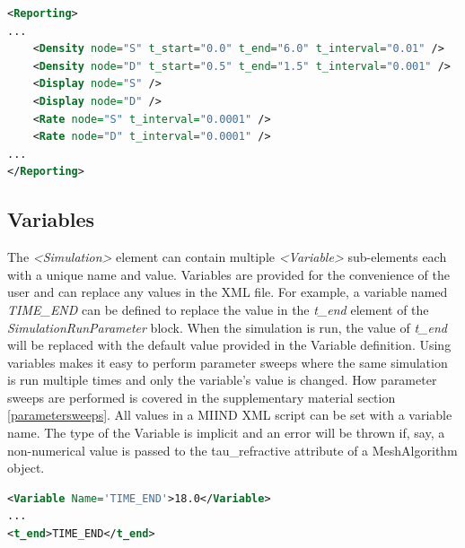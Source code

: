 \documentclass[utf8]{frontiersSCNS} %
\begin{document}
\begin{lstlisting}[language=xml,caption={A set of reporting definitions to record the probability densities and rates of two populations, S and D. The densities will also be displayed during simulation.}]
<Reporting>
...
	<Density node="S" t_start="0.0" t_end="6.0" t_interval="0.01" />
	<Density node="D" t_start="0.5" t_end="1.5" t_interval="0.001" />
	<Display node="S" />
	<Display node="D" />
	<Rate node="S" t_interval="0.0001" />
	<Rate node="D" t_interval="0.0001" />
...
</Reporting>
\end{lstlisting}

\subsection{Variables}
\label{variables}
The \textit{\textless Simulation\textgreater} element can contain multiple \textit{\textless Variable\textgreater} sub-elements each with a unique name and value. Variables are provided for the convenience of the user and can replace any values in the XML file. For example, a variable named \textit{TIME\_END} can be defined to replace the value in the \textit{t\_end} element of the \textit{SimulationRunParameter} block. When the simulation is run, the value of \textit{t\_end} will be replaced with the default value provided in the Variable definition. Using variables makes it easy to perform parameter sweeps where the same simulation is run multiple times and only the variable's value is changed. How parameter sweeps are performed is covered in the supplementary material section \ref{parametersweeps}.
All values in a MIIND XML script can be set with a variable name. The type of the Variable is implicit and an error will be thrown if, say, a non-numerical value is passed to the tau\_refractive attribute of a MeshAlgorithm object.

\begin{lstlisting}[language=xml,caption={A Variable definition. TIME\_END has a default value of 18.0 and is used in the \textit{t\_end} parameter definition.}]
<Variable Name='TIME_END'>18.0</Variable>
...
<t_end>TIME_END</t_end>
\end{lstlisting}
\end{document}
